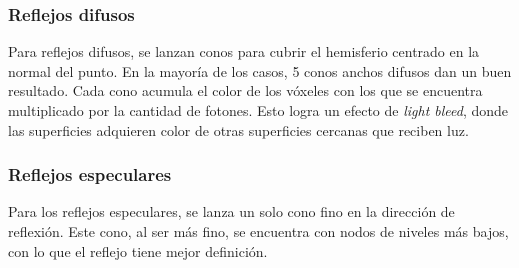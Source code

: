 \subsubsection{Reflejos difusos}

Para reflejos difusos, se lanzan conos para cubrir el hemisferio centrado en la normal del punto.
En la mayoría de los casos, 5 conos anchos difusos dan un buen resultado.
Cada cono acumula el color de los vóxeles con los que se encuentra multiplicado por la cantidad de fotones.
Esto logra un efecto de \textit{light bleed}, donde las superficies adquieren color de otras superficies cercanas que reciben luz.

\subsubsection{Reflejos especulares}

Para los reflejos especulares, se lanza un solo cono fino en la dirección de reflexión.
Este cono, al ser más fino, se encuentra con nodos de niveles más bajos, con lo que el reflejo tiene mejor definición.

